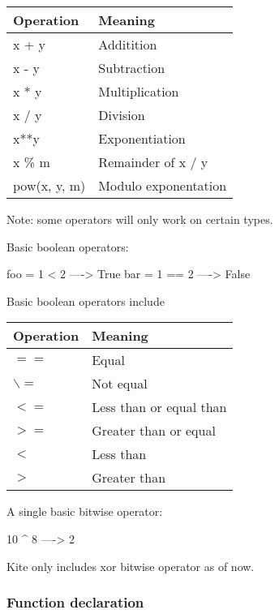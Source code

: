 \begin{table}[H]
\centering
    \begin{tabular}{|l|l|}
    \hline
    Operation    & Meaning              \\ \hline
    x + y        & Additition           \\ \hline
    x - y        & Subtraction          \\ \hline
    x * y        & Multiplication       \\ \hline
    x / y        & Division             \\ \hline
    x**y         & Exponentiation       \\ \hline
    x \% m       & Remainder of x / y   \\ \hline
    pow(x, y, m) & Modulo exponentation \\ \hline
    \end{tabular}
\end{table}
Note: some operators will only work on certain types.

Basic boolean operators:
\begin{kite}
foo = 1 < 2  ----> True
bar = 1 == 2 ----> False
\end{kite}
Basic boolean operators include 
\begin{table}[H]
\centering
    \begin{tabular}{|l|l|}
    \hline
    Operation & Meaning                 \\ \hline
    $==$        & Equal                   \\ \hline
    $\backslash=$        & Not equal               \\ \hline
    $<=$        & Less than or equal than \\ \hline
    $>=$        & Greater than or equal   \\ \hline
    $<$         & Less than               \\ \hline
    $>$         & Greater than            \\ \hline
    \end{tabular}
\end{table}

A single basic bitwise operator:
\begin{kite}
10 ^ 8 ----> 2
\end{kite}
Kite only includes xor bitwise operator as of now.

\subsubsection{Function declaration}

